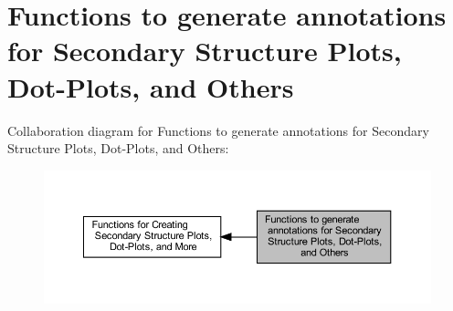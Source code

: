 \hypertarget{group__annotation__utils}{}\section{Functions to generate annotations for Secondary Structure Plots, Dot-\/\+Plots, and Others}
\label{group__annotation__utils}
Collaboration diagram for Functions to generate annotations for Secondary Structure Plots, Dot-\/\+Plots, and Others\+:
\nopagebreak
\begin{figure}[H]
\begin{center}
\leavevmode
\includegraphics[width=350pt]{group__annotation__utils}
\end{center}
\end{figure}
